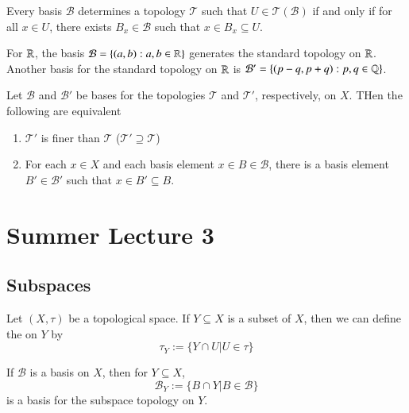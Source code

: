 \documentclass[12pt, a4paper, oneside, openright, titlepage]{book}
\begin{document}
\begin{lemma}
    Every basis $\mathcal{B}$ determines a topology $\mathcal{T}$ such that $U \in \mathcal{T}(\mathcal{B})$ if and only if for all $x \in U$, there exists $B_x \in \mathcal{B}$ such that $x \in B_x \subseteq U$. 
\end{lemma}

\begin{example}
    For $\mathbb R$, the basis $\mathcal{B} = \{(a,b):a, b\in \mathbb R\}$ generates the standard topology on $\mathbb R$. Another basis for the standard topology on $\mathbb R$ is $\mathcal{B}' = \{(p-q,p+q):p,q \in \mathbb Q\}$.
\end{example}


\begin{lemma}
    Let $\mathcal{B}$ and $\mathcal{B}'$ be bases for the topologies $\mathcal{T}$ and $\mathcal{T}'$, respectively, on $X$. THen the following are equivalent \begin{enumerate}
        \item $\mathcal{T}'$ is finer than $\mathcal{T}$ ($\mathcal{T}'\supseteq \mathcal{T}$)
        \item For each $x \in X$ and each basis element $x \in B \in \mathcal{B}$, there is a basis element $B' \in \mathcal{B}'$ such that $x \in B'\subseteq B$.
    \end{enumerate}
\end{lemma}


\section{Summer Lecture 3} 

\subsection{Subspaces}

\begin{definition}
    Let $(X,\tau)$ be a topological space. If $Y \subseteq X$ is a subset of $X$, then we can define the  on $Y$ by \begin{equation*}
        \tau_Y := \{Y\cap U\vert U \in \tau\}
    \end{equation*}
\end{definition}

\begin{lemma}
    If $\mathcal{B}$ is a basis on $X$, then for $Y \subseteq X$, \begin{equation*}
        \mathcal{B}_Y := \{B\cap Y\vert B\in \mathcal{B}\}
    \end{equation*}
    is a basis for the subspace topology on $Y$.
\end{lemma}
\end{document}
